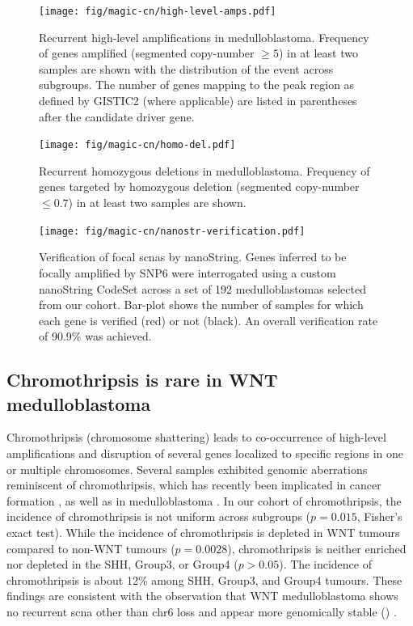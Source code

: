\begin{figure}[5]
	\centering
	\texttt{[image: fig/magic-cn/high-level-amps.pdf]}
	\caption[Recurrent high-level amplifications in medulloblastoma]
	{
		Recurrent high-level amplifications in medulloblastoma.
		Frequency of genes amplified (segmented copy-number $\geq 5$) in at least two samples are shown with the distribution of the event across subgroups. The number of genes mapping to the peak region as defined by GISTIC2 (where applicable) are listed in parentheses after the candidate driver gene.
	}
	\label{fig:high-level-amps}
\end{figure}

\begin{figure}[5]
	\centering
	\texttt{[image: fig/magic-cn/homo-del.pdf]}
	\caption[Recurrent homozygous deletions in medulloblastoma]
	{
		Recurrent homozygous deletions in medulloblastoma.
		Frequency of genes targeted by homozygous deletion (segmented copy-number $\leq 0.7$) in at least two samples are shown.
	}
	\label{fig:homo-del}
\end{figure}

\begin{figure}
	\centering
	\texttt{[image: fig/magic-cn/nanostr-verification.pdf]}
	\caption[Verification of focal \gls{scnas} by nanoString]
	{
		Verification of focal \gls{scnas} by nanoString.
		Genes inferred to be focally amplified by SNP6 were interrogated using a custom nanoString CodeSet across a set of 192 medulloblastomas selected from our cohort. Bar-plot shows the number of samples for which each gene is verified (red) or not (black). An overall verification rate of 90.9\% was achieved.
	}
	\label{fig:nanostr-verification}
\end{figure}

\subsection{Chromothripsis is rare in WNT medulloblastoma}

Chromothripsis (chromosome shattering) leads to co-occurrence of high-level amplifications and disruption of several genes localized to specific regions in one or multiple chromosomes. Several samples exhibited genomic aberrations reminiscent of chromothripsis, which has recently been implicated in cancer formation , as well as in medulloblastoma . In our cohort of chromothripsis, the incidence of chromothripsis is not uniform across subgroups ($p = 0.015$, Fisher's exact test). While the incidence of chromothripsis is depleted in WNT tumours compared to non-WNT tumours ($p = 0.0028$), chromothripsis is neither enriched nor depleted in the SHH, Group3, or Group4 ($p > 0.05$). The incidence of chromothripsis is about 12\% among SHH, Group3, and Group4 tumours. These findings are consistent with the observation that WNT medulloblastoma shows no recurrent \gls{scna} other than chr6 loss and appear more genomically stable () .

